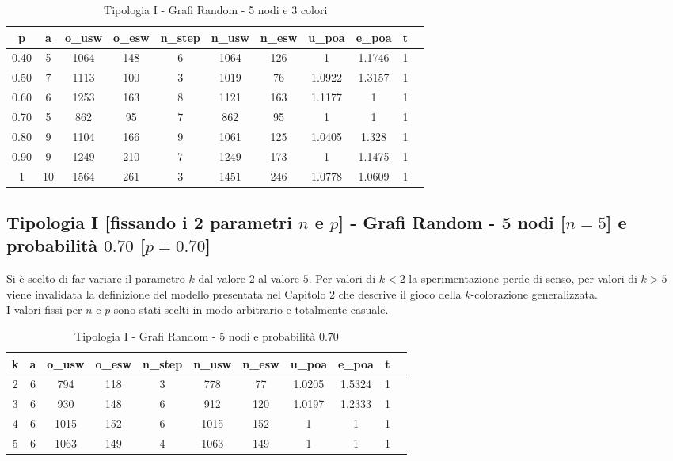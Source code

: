 \begin{table}[H]
\centering
\scalebox{0.9} {
\begin{tabular}{|c|c|c|c|c|c|c|c|c|c|c|}
\hline
\textbf{p} & \textbf{a} & \textbf{o\_usw} & \textbf{o\_esw} & \textbf{n\_step} & \textbf{n\_usw} & \textbf{n\_esw} & \textbf{u\_poa} & \textbf{e\_poa} & \textbf{t} \\ \hline
0.40 & 5 & 1064 & 148 & 6 & 1064 & 126 & 1 & 1.1746 & 1 \\ \hline
0.50 & 7 & 1113 & 100 & 3 & 1019 & 76 & 1.0922 & 1.3157 & 1 \\ \hline
0.60 & 6 & 1253 & 163 & 8 & 1121 & 163 & 1.1177 & 1 & 1 \\ \hline
0.70 & 5 & 862 & 95 & 7 & 862 & 95 & 1 & 1 & 1 \\ \hline
0.80 & 9 & 1104 & 166 & 9 & 1061 & 125 & 1.0405 & 1.328 & 1 \\ \hline
0.90 & 9 & 1249 & 210 & 7 & 1249 & 173 & 1 & 1.1475 & 1 \\ \hline
1 & 10 & 1564 & 261 & 3 & 1451 & 246 & 1.0778 & 1.0609 & 1 \\ \hline
\end{tabular}
}
\caption{Tipologia I - Grafi Random - 5 nodi e 3 colori}
\label{tab:sperimentazione-tipo1-5nodi3colori}
\end{table}

\subsection{Tipologia I [fissando i 2 parametri $n$ e $p$] - Grafi Random - 5 nodi [$n=5$] e probabilità $0.70$ [$p=0.70$]}
Si è scelto di far variare il parametro $k$ dal valore $2$ al valore $5$. Per valori di \(k<2\) la sperimentazione perde di senso, per valori di \(k>5\) viene invalidata la definizione del modello presentata nel Capitolo 2 che descrive il gioco della \(k\)-colorazione generalizzata.\\
I valori fissi per $n$ e $p$ sono stati scelti in modo arbitrario e totalmente casuale.

\begin{table}[H]
\centering
\scalebox{0.9} {
\begin{tabular}{|c|c|c|c|c|c|c|c|c|c|c|}
\hline
\textbf{k} & \textbf{a} & \textbf{o\_usw} & \textbf{o\_esw} & \textbf{n\_step} & \textbf{n\_usw} & \textbf{n\_esw} & \textbf{u\_poa} & \textbf{e\_poa} & \textbf{t} \\ \hline
2 & 6 & 794 & 118 & 3 & 778 & 77 & 1.0205 & 1.5324 & 1 \\ \hline
3 & 6 & 930 & 148 & 6 & 912 & 120 & 1.0197 & 1.2333 & 1 \\ \hline
4 & 6 & 1015 & 152 & 6 & 1015 & 152 & 1 & 1 & 1 \\ \hline
5 & 6 & 1063 & 149 & 4 & 1063 & 149 & 1 & 1 & 1 \\ \hline
\end{tabular}
}
\caption{Tipologia I - Grafi Random - 5 nodi e probabilità $0.70$}
\label{tab:sperimentazione-tipo1-5nodi070probab}
\end{table}

